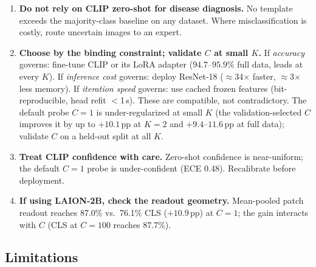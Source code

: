 \documentclass[10pt,a4paper]{article}
\begin{document}
\begin{enumerate}
    \item \textbf{Do not rely on CLIP zero-shot for disease diagnosis.} No template exceeds the majority-class baseline on any dataset. Where misclassification is costly, route uncertain images to an expert.
    \item \textbf{Choose by the binding constraint; validate $C$ at small $K$.} If \emph{accuracy} governs: fine-tune CLIP or its LoRA adapter ($94.7$--$95.9\%$ full data, leads at every $K$). If \emph{inference cost} governs: deploy ResNet-18 ($\approx$34$\times$ faster, $\approx$3$\times$ less memory). If \emph{iteration speed} governs: use cached frozen features (bit-reproducible, head refit $<$1\,s). These are compatible, not contradictory. The default probe $C{=}1$ is under-regularized at small $K$ (the validation-selected $C$ improves it by up to $+10.1$\,pp at $K{=}2$ and $+9.4$--$11.6$\,pp at full data); validate $C$ on a held-out split at all $K$.
    \item \textbf{Treat CLIP confidence with care.} Zero-shot confidence is near-uniform; the default $C{=}1$ probe is under-confident (ECE 0.48). Recalibrate before deployment.
    \item \textbf{If using LAION-2B, check the readout geometry.} Mean-pooled patch readout reaches 87.0\% vs.\ 76.1\% CLS ($+10.9$\,pp) at $C{=}1$; the gain interacts with $C$ (CLS at $C{=}100$ reaches 87.7\%).
\end{enumerate}

\subsection{Limitations}
\end{document}
